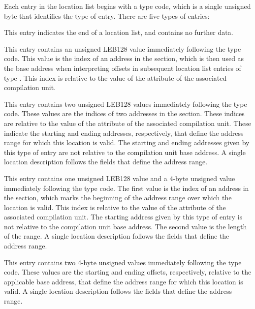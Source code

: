Each entry in the location list
begins with a type code, which is a single unsigned byte that
identifies the type of entry. There are five types of entries:
\begin{enumerate}
\itembfnl{\DWLLEendoflistentryTARG}
This entry indicates the end of a location list, and
contains no further data.

\itembfnl{\DWLLEbaseaddressselectionentryTARG}
This entry contains an 
unsigned LEB128 value immediately
following the type code. This value is the index of an
address in the \dotdebugaddr{} section, which is then used as
the base address when interpreting offsets in subsequent
location list entries of type \DWLLEoffsetpairentry.
This index is relative to the value of the 
\DWATaddrbase{} attribute of the associated compilation unit.

\itembfnl{\DWLLEstartendentryTARG}
This entry contains two unsigned LEB128
values immediately following the type code. These values are the
indices of two addresses in the \dotdebugaddr{} section.
These indices are relative to the value of the 
\DWATaddrbase{} attribute of the associated compilation unit.
These indicate the starting and ending addresses,
respectively, that define the address range for which
this location is valid. The starting and ending addresses
given by this type of entry are not relative to the
compilation unit base address. A single location
description follows the fields that define the address range.

\itembfnl{\DWLLEstartlengthentryTARG}
This entry contains one unsigned LEB128
value and a 4-byte
unsigned value immediately following the type code. The
first value is the index of an address in the \dotdebugaddr{}
section, which marks the beginning of the address range
over which the location is valid.
This index is relative to the value of the 
\DWATaddrbase{} attribute of the associated compilation unit.
The starting address given by this
type of entry is not relative to the compilation unit
base address. The second value is the
length of the range. A single location
description follows the fields that define the address range.

\itembfnl{\DWLLEoffsetpairentryTARG}
This entry contains two 4-byte unsigned values
immediately following the type code. These values are the
starting and ending offsets, respectively, relative to
the applicable base address, that define the address
range for which this location is valid. A single location
description follows the fields that define the address range.
\end{enumerate}


